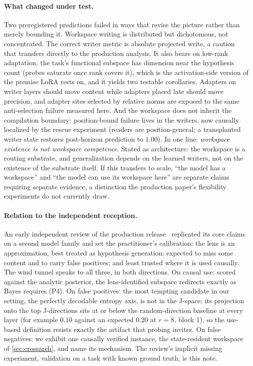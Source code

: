\documentclass[11pt]{article}
\newcommand{\Jspace}{J\mbox{-}space}
\begin{document}
\paragraph{What changed under test.} Two preregistered predictions failed
in ways that revise the picture rather than merely bounding it. Workspace
writing is distributed but dichotomous, not concentrated. The
correct writer metric is absolute projected write, a caution that
transfers directly to the production analysis. It also bears on
low-rank adaptation: the task's functional subspace has dimension near
the hypothesis count (probes saturate once rank covers it), which is
the activation-side version of the premise LoRA rests on, and it
yields two testable corollaries. Adapters on writer layers should move
content while adapters placed late should move precision, and adapter
sites selected by relative norms are exposed to the same
anti-selection failure measured here. And the workspace does not
inherit the compilation boundary: position-bound failure lives in the
writers, now causally localized by the rescue experiment (readers are
position-general; a transplanted writer state restores post-horizon
prediction to $1.00$). In one line: \emph{workspace
existence is not workspace competence}. Stated as architecture: the
workspace is a routing substrate, and generalization depends on the
learned writers, not on the existence of the substrate itself. If this transfers to scale,
``the model has a workspace'' and ``the model can use its workspace
here'' are separate claims requiring separate evidence, a distinction
the production paper's flexibility experiments do not currently draw.

\paragraph{Relation to the independent reception.} An early independent
review of the production release~\citep{nanda2026review} replicated its
core claims on a second model family and set the practitioner's
calibration: the lens is an approximation, best treated as hypothesis
generation; expected to miss some content and to carry false positives;
and least trusted where it is used causally. The wind tunnel speaks to
all three, in both directions. On causal use: scored against the
analytic posterior, the lens-identified subspace redirects exactly as
Bayes requires (P4). On false positives: the most tempting candidate in
our setting, the perfectly decodable entropy axis, is not in the
\Jspace{}: its projection onto the top J-directions sits at or below
the random-direction baseline at every layer (for example $0.10$ against
an expected $0.20$ at $r{=}8$, block 1), so the use-based definition
resists exactly the artifact that probing invites. On false negatives:
we exhibit one causally verified instance, the state-resident workspace
of \cref{sec:crossarch}, and name its mechanism. The review's implicit
missing experiment, validation on a task with known ground truth, is
this note.
\end{document}
